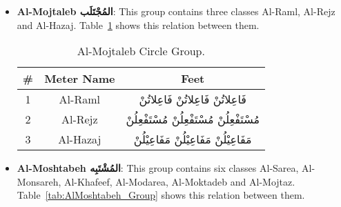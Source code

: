 \begin{itemize}


\item \textbf{Al-Mojtaleb \textarabic{المُجْتَلَب}}: This group contains three classes Al-Raml, Al-Rejz and Al-Hazaj. Table~\ref{tab:AlMojtaleb_Group} shows this relation between them.


\begin{table}[H]
  \centering
  \begin{tabular}{c c c}
    \hline
    \textbf{\#} & \textbf{Meter Name}  & \textbf{Feet} \\
    \hline
    1 & \textarabic{Al-Raml} & \textarabic{فَاعِلاتُنْ فَاعِلاتُنْ فَاعِلاتُنْ}\\
    2 &\textarabic{Al-Rejz}&  \textarabic{مُسْتَفْعِلُنْ مُسْتَفْعِلُنْ مُسْتَفْعِلُنْ}\\
    3 &\textarabic{Al-Hazaj}  & \textarabic{مَفَاعِيْلُنْ مَفَاعِيْلُنْ مَفَاعِيْلُنْ}\\
    \hline                                                
  \end{tabular}
\caption{Al-Mojtaleb Circle Group.}\label{tab:AlMojtaleb_Group}
\end{table}
    
  


\item \textbf{Al-Moshtabeh \textarabic{المُشْتَبِه}}: This group contains six classes Al-Sarea, Al-Monsareh, Al-Khafeef, Al-Modarea, Al-Moktadeb and Al-Mojtaz. Table~\ref{tab:AlMoshtabeh_Group} shows this relation between them.



\end{itemize}
